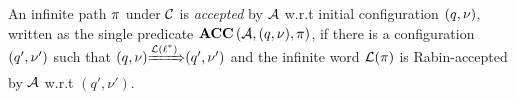\begin{definition}\label{def:fnacc}
An infinite path $\pi$ under $\mathcal{C}$ is \emph{accepted} by $\mathcal{A}$ w.r.t
initial configuration $(q,\nu)$, written as the single predicate $\mbox{\bf ACC} \left( {\mathcal{A}}, {(q,\nu)}, {\pi} \right)$,
if there is a configuration $(q',\nu')$ such that ${(q,\nu)}{\xRightarrow{\mathcal{L}(\ell^*)}}{(q',\nu')}$ and
the infinite word $\mathcal{L}(\pi)$ is Rabin-accepted by $\mathcal{A}$ w.r.t
$
\left(q',\nu'\right)
$.
\end{definition}

